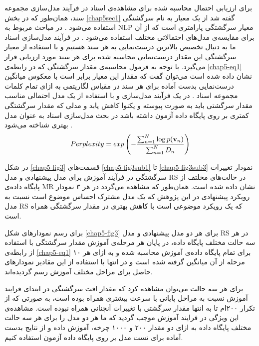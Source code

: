 برای ارزیابی احتمال محاسبه شده برای مشاهده‌ی اسناد در فرآیند مدل‌سازی مجموعه سند، همان‌طور که در بخش 
\ref{chap5sec1}
گفته شد از یک معیار به نام سرگشتگی استفاده می‌‌شود
\cite{blei2003latent}.
در مباحث مربوط به 
NLP
معیار سرگشتگی پارامتری است که از آن برای مقایسه‌ی مدل‌های احتمالاتی مختلف استفاده می‌شود
\cite{blei2003latent}.
 در فرآیند مدل‌سازی اسناد ما به دنبال تخصیص بالاترین درست‌نمایی به هر سند هستیم و با استفاده از معیار سرگشتگی این مقدار درست‌نمایی 
 محاسبه ‌شده برای هر سند مورد ارزیابی قرار می‌‌گیرد. با توجه به فرمول محاسبه‌ی مقدار سرگشتگی که در رابطه‌ی
\ref{chap5-eq1}
نشان داده شده است می‌‌توان گفت که مقدار این معیار برابر است با معکوس میانگین درست‌نمایی بدست آماده برای هر سند در مقیاس لگاریتمی به ازای تمام کلمات مجموعه اسناد
\cite{blei2003latent}.
 در یک فرآیند مدل‌سازی و با استفاده از یک مدل احتمالی‌ مناسب مقدار سرگشتی باید به صورت پیوسته و یکنوا کاهش یابد و مدلی که مقدار سرگشتگی کمتری بر روی پایگاه داده آزمون داشته باشد در بحث مدل‌سازی اسناد به عنوان مدل بهتری شناخته می‌‌شود
\cite{blei2003latent}.
\begin{align}
	\centering
	\label{chap5-eq1}
	Perplexity = exp\left( - \dfrac{\sum_{n=1}^{N}\log p(\textbf{v}_n)}{\sum_{n=1}^{N}D_n} \right)
\end{align}

در شکل 
\ref{chap5-fig3}
قسمت‌های
\ref{chap5-fig3sub1}
 تا
 \ref{chap5-fig3sub3}
  نمودار تغییرات سرگشتگی در فرآیند آموزش برای مدل پیشنهادی و مدل 
RS
در حالت‌های مخلتف از پایگاه داده‌ی 
MR
نشان داده شده است. همان‌طور که مشاهده می‌‌گردد در هر ۳ نمودار رویکرد پیشنهادی در این پژوهش که یک مدل مشترک احساس موضوع است نسبت به مدل 
RS
که یک رویکرد موضوعی است با کاهش بهتری در مقدار سرگشتگی همراه است. 

برای رسم نمودارهای شکل
\ref{chap5-fig3}
برای هر دو مدل پیشنهادی و مدل
RS
در هر سه‌ حالت مختلف پایگاه داده، در پایان هر مرحله‌ی آموزش مقدار سرگشتگی با استفاده از رابطه‌ی
\ref{chap5-eq1}
برای تمام پایگاه داده‌ی ‌آموزش محاسبه شده و به ازای هر ۱۰ مرحله از آن میانگین گرفته شده است و در انتها با استفاده از این مقادیر نمودارهای حاصل برای مراحل مختلف آموزش رسم گردیده‌اند.

برای هر سه حالت می‌‌توان مشاهده کرد که مقدار افت سرگشتگی در ابتدای فرایند آموزش نسبت به مراحل پایانی با سرعت بیشتری همراه بوده است، به صورتی‌ که از تکرار ۲۰۰ام تا به انتها مقدار سرگشتی با تغییرات آنچنانی همراه نبوده است. مشاهده‌ی این ویژگی‌ در فرایند آموزش موجب گردید که ما هر دو مدل را برای هر سه حالت مختلف پایگاه داده به ازای دو مقدار ۲۰۰ و ۱۰۰۰ چرخه‌، آموزش داده و از نتایج بدست آماده برای تست مدل بر روی پایگاه داده آزمون استفاده کنیم. 

